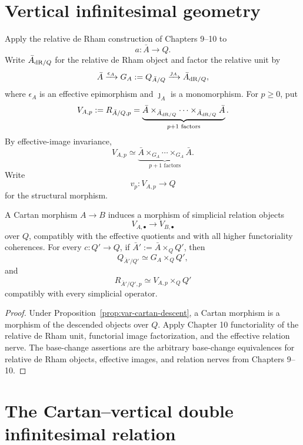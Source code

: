 \section{Vertical infinitesimal geometry}
\label{sec:var-vertical-geometry}

\begin{definition}
\label{def:var-vertical-relation}
Apply the relative de Rham construction of Chapters 9--10 to
\[
    a:\bar A\longrightarrow Q.
\]
Write \(\bar A_{\mathrm{dR}/Q}\) for the relative de Rham object and factor the relative unit by
\[
    \bar A
    \xrightarrow{\epsilon_A}
    G_A:=Q_{\bar A/Q}
    \xrightarrow{\jmath_A}
    \bar A_{\mathrm{dR}/Q},
\]
where \(\epsilon_A\) is an effective epimorphism and \(\jmath_A\) is a monomorphism. For \(p\ge0\), put
\[
    V_{A,p}:=R_{\bar A/Q,p}
    =
    \underbrace{
    \bar A\times_{\bar A_{\mathrm{dR}/Q}}\cdots\times_{\bar A_{\mathrm{dR}/Q}}\bar A
    }_{p+1\text{ factors}}.
\]
By effective-image invariance,
\[
    V_{A,p}
    \simeq
    \underbrace{
    \bar A\times_{G_A}\cdots\times_{G_A}\bar A
    }_{p+1\text{ factors}}.
\]
Write
\[
    v_p:V_{A,p}\longrightarrow Q
\]
for the structural morphism.
\end{definition}

\begin{proposition}
\label{prop:var-vertical-functoriality}
A Cartan morphism \(A\to B\) induces a morphism of simplicial relation objects
\[
    V_{A,\bullet}\longrightarrow V_{B,\bullet}
\]
over \(Q\), compatibly with the effective quotients and with all higher functoriality coherences. For every \(c:Q'\to Q\), if \(\bar A':=\bar A\times_QQ'\), then
\[
    Q_{\bar A'/Q'}\simeq G_A\times_QQ',
\]
and
\[
    R_{\bar A'/Q',p}
    \simeq
    V_{A,p}\times_QQ'
\]
compatibly with every simplicial operator.
\end{proposition}

\begin{proof}
Under Proposition~\ref{prop:var-cartan-descent}, a Cartan morphism is a morphism of the descended objects over \(Q\). Apply Chapter 10 functoriality of the relative de Rham unit, functorial image factorization, and the effective relation nerve. The base-change assertions are the arbitrary base-change equivalences for relative de Rham objects, effective images, and relation nerves from Chapters 9--10.
\end{proof}

\section{The Cartan--vertical double infinitesimal relation}
\label{sec:var-double-relation}

